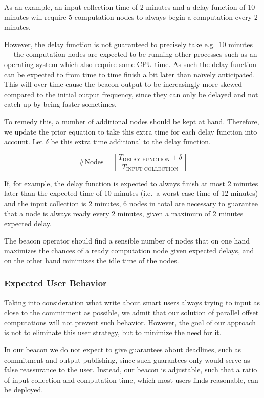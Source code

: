 As an example, an input collection time of 2 minutes and a delay function of 10 minutes will require 5 computation nodes to always begin a computation every 2 minutes.

However, the delay function is not guaranteed to precisely take e.g.\ 10 minutes --- the computation nodes are expected to be running other processes such as an operating system which also require some CPU time.
As such the delay function can be expected to from time to time finish a bit later than naïvely anticipated. This will over time cause the beacon output to be increasingly more skewed compared to the initial output frequency, since they can only be delayed and not catch up by being faster sometimes.

To remedy this, a number of additional nodes should be kept at hand.
Therefore, we update the prior equation to take this extra time for each delay function into account. Let $\delta$ be this extra time additional to the delay function.

\begin{equation*}
    \#\text{Nodes} = \left\lceil\frac{T_\text{DELAY FUNCTION}+\delta}{T_\text{INPUT COLLECTION}}\right\rceil
\end{equation*}

If, for example, the delay function is expected to always finish at most 2 minutes later than the expected time of 10 minutes (i.e.\ a worst-case time of 12 minutes) and the input collection is 2 minutes, 6 nodes in total are necessary to guarantee that a node is always ready every 2 minutes, given a maximum of 2 minutes expected delay.

The beacon operator should find a sensible number of nodes that on one hand maximizes the chances of a ready computation node given expected delays, and on the other hand minimizes the idle time of the nodes.

\subsubsection{Expected User Behavior}
Taking into consideration what \citet{randomzoo} write about smart users always trying to input as close to the commitment as possible, we admit that our solution of parallel offset computations will not prevent such behavior.
However, the goal of our approach is not to eliminate this user strategy, but to minimize the need for it.

In our beacon we do not expect to give guarantees about deadlines, such as commitment and output publishing, since such guarantees only would serve as false reassurance to the user.
Instead, our beacon is adjustable, such that a ratio of input collection and computation time, which most users finds reasonable, can be deployed.

